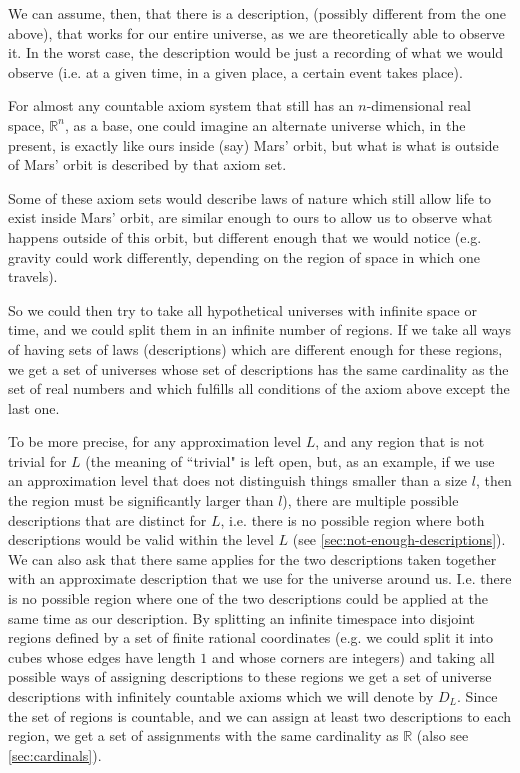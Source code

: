 \documentclass[a4paper
,draft
]{article}
\def\reale{\mathbb{R}}
\def\descriptions{D_L}
\newcommand{\ghilimele}[1]{``#1"}
\begin{document}
We can assume, then, that there is a description,
(possibly different from the one above), that works for our entire universe,
as we are theoretically able to observe it. In the worst case, the description
would be just a recording of what we would observe (i.e. at a given time, in
a given place, a certain event takes place).

For almost any countable axiom system that still
has an $n$-dimensional real space, $\reale^n$, as a base,
one could imagine an alternate universe
which, in the present, is exactly like ours inside (say) Mars' orbit,
but what is what is outside of Mars' orbit is described by that axiom set.

Some of these axiom sets would describe laws of nature which still allow life
to exist inside Mars' orbit, are similar enough
to ours to allow us to observe what happens outside of this orbit,
but different enough that
we would notice (e.g. gravity could work differently, depending on the region
of space in which one travels).

So we could then try to take all hypothetical universes with infinite space
or time, and we could split them in an infinite number of regions. If we take
all ways of having sets of laws (descriptions) which are different enough
for these regions,
we get a set of universes whose set of descriptions has the same cardinality
as the set of real numbers and which fulfills all conditions of the axiom
above except the last one.

To be more precise, for any approximation level $L$, and any region that
is not trivial for $L$
(the meaning of \ghilimele{trivial} is left open, but, as an example,
if we use an approximation level that does not distinguish things smaller
than a size $l$, then the region must be significantly larger than $l$),
there are multiple possible descriptions that
are distinct for $L$, i.e. there is no possible region where both descriptions
would be valid within the level $L$ (see \ref{sec:not-enough-descriptions}).
We can also ask that there same applies for the two descriptions taken together
with an approximate description that we use for the universe around us.
I.e. there is no possible region where one of the two descriptions could
be applied at the same time as our description.
By splitting an infinite timespace
into disjoint regions defined by a set of finite rational coordinates
(e.g. we could split it into cubes whose edges have length $1$ and whose
corners are integers)
and taking all possible ways of assigning descriptions to these regions
we get a set of universe descriptions with infinitely countable axioms
which we will denote by $\descriptions$.
Since the set of regions is countable, and we can assign at least two
descriptions to each region, we get a set of assignments with the same
cardinality as $\reale$ (also see \ref{sec:cardinals}).
\end{document}
